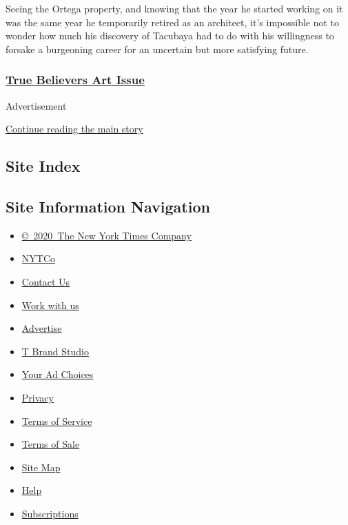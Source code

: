 Seeing the Ortega property, and knowing that the year he started working
on it was the same year he temporarily retired as an architect, it's
impossible not to wonder how much his discovery of Tacubaya had to do
with his willingness to forsake a burgeoning career for an uncertain but
more satisfying future.

\hypertarget{true-believers-art-issue}{%
\subsubsection{\texorpdfstring{\href{https://www.nytimes.com/issue/t-magazine/2020/07/02/true-believers-art-issue}{True
Believers Art
Issue}}{True Believers Art Issue}}\label{true-believers-art-issue}}

Advertisement

\protect\hyperlink{after-bottom}{Continue reading the main story}

\hypertarget{site-index}{%
\subsection{Site Index}\label{site-index}}

\hypertarget{site-information-navigation}{%
\subsection{Site Information
Navigation}\label{site-information-navigation}}

\begin{itemize}
\tightlist
\item
  \href{https://help.nytimes.com/hc/en-us/articles/115014792127-Copyright-notice}{©~2020~The
  New York Times Company}
\end{itemize}

\begin{itemize}
\tightlist
\item
  \href{https://www.nytco.com/}{NYTCo}
\item
  \href{https://help.nytimes.com/hc/en-us/articles/115015385887-Contact-Us}{Contact
  Us}
\item
  \href{https://www.nytco.com/careers/}{Work with us}
\item
  \href{https://nytmediakit.com/}{Advertise}
\item
  \href{http://www.tbrandstudio.com/}{T Brand Studio}
\item
  \href{https://www.nytimes.com/privacy/cookie-policy\#how-do-i-manage-trackers}{Your
  Ad Choices}
\item
  \href{https://www.nytimes.com/privacy}{Privacy}
\item
  \href{https://help.nytimes.com/hc/en-us/articles/115014893428-Terms-of-service}{Terms
  of Service}
\item
  \href{https://help.nytimes.com/hc/en-us/articles/115014893968-Terms-of-sale}{Terms
  of Sale}
\item
  \href{https://spiderbites.nytimes.com}{Site Map}
\item
  \href{https://help.nytimes.com/hc/en-us}{Help}
\item
  \href{https://www.nytimes.com/subscription?campaignId=37WXW}{Subscriptions}
\end{itemize}
